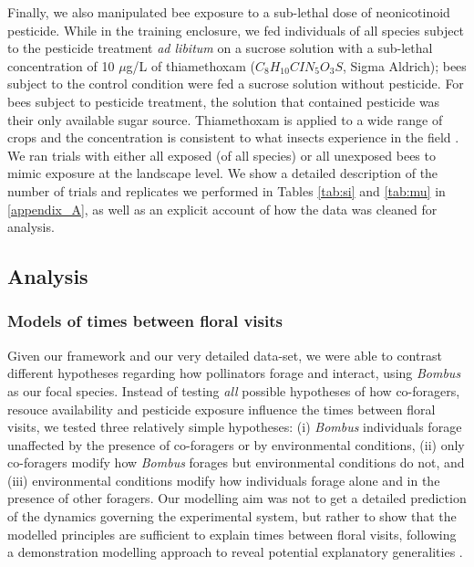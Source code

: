 \begin{refsection}
Finally, we also manipulated bee exposure to a sub-lethal dose of neonicotinoid pesticide. While in the training enclosure, we fed individuals of all species subject to the pesticide treatment \textit{ad libitum} on a sucrose solution with a sub-lethal concentration of 10 $\mu$g/L of thiamethoxam ($C_{8}H_{10}CIN_{5}O_{3}S$, Sigma Aldrich); bees subject to the control condition were fed a sucrose solution without pesticide. For bees subject to pesticide treatment, the solution that contained pesticide was their only available sugar source. Thiamethoxam is applied to a wide range of crops \citep{maienfisch_chemistry_2001} and the concentration is consistent to what insects experience in the field \citep{blacquiere_neonicotinoids_2012}. We ran trials with either all exposed (of all species) or all unexposed bees to mimic exposure at the landscape level. We show a detailed description of the number of trials and replicates we performed in Tables \ref{tab:si} and \ref{tab:mu} in \autoref{appendix_A}, as well as an explicit account of how the data was cleaned for analysis.

\subsection*{Analysis}

\subsubsection*{Models of times between floral visits}

Given our framework and our very detailed data-set, we were able to contrast different hypotheses regarding how pollinators forage and interact, using \textit{Bombus} as our focal species. Instead of testing \textit{all} possible hypotheses of how co-foragers, resouce availability and pesticide exposure influence the times between floral visits, we tested three relatively simple hypotheses: (i) \textit{Bombus} individuals forage unaffected by the presence of co-foragers or by environmental conditions, (ii) only co-foragers modify how \textit{Bombus} forages but environmental conditions do not, and (iii) environmental conditions modify how individuals forage alone and in the presence of other foragers. Our modelling aim was not to get a detailed prediction of the dynamics governing the experimental system, but rather to show that the modelled principles are sufficient to explain times between floral visits, following a demonstration modelling approach to reveal potential explanatory generalities \citep{evans2013simple}.



\end{refsection}
